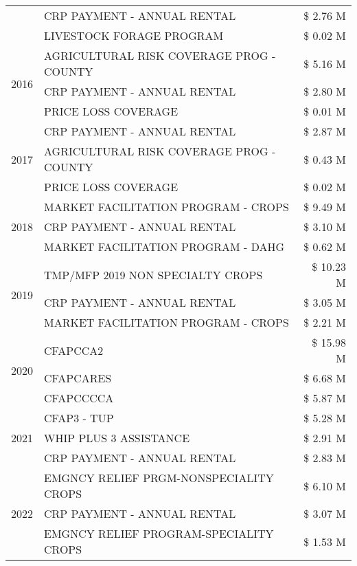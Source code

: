 \begin{tabular}{llr}
 & CRP PAYMENT - ANNUAL RENTAL & \$ 2.76 M \\
 & LIVESTOCK FORAGE PROGRAM & \$ 0.02 M \\
\cline{1-3}
\multirow[t]{3}{*}{2016} & AGRICULTURAL RISK COVERAGE PROG - COUNTY & \$ 5.16 M \\
 & CRP PAYMENT - ANNUAL RENTAL & \$ 2.80 M \\
 & PRICE LOSS COVERAGE & \$ 0.01 M \\
\cline{1-3}
\multirow[t]{3}{*}{2017} & CRP PAYMENT - ANNUAL RENTAL & \$ 2.87 M \\
 & AGRICULTURAL RISK COVERAGE PROG - COUNTY & \$ 0.43 M \\
 & PRICE LOSS COVERAGE & \$ 0.02 M \\
\cline{1-3}
\multirow[t]{3}{*}{2018} & MARKET FACILITATION PROGRAM - CROPS & \$ 9.49 M \\
 & CRP PAYMENT - ANNUAL RENTAL & \$ 3.10 M \\
 & MARKET FACILITATION PROGRAM - DAHG & \$ 0.62 M \\
\cline{1-3}
\multirow[t]{3}{*}{2019} & TMP/MFP 2019 NON SPECIALTY CROPS & \$ 10.23 M \\
 & CRP PAYMENT - ANNUAL RENTAL & \$ 3.05 M \\
 & MARKET FACILITATION PROGRAM - CROPS & \$ 2.21 M \\
\cline{1-3}
\multirow[t]{3}{*}{2020} & CFAPCCA2 & \$ 15.98 M \\
 & CFAPCARES & \$ 6.68 M \\
 & CFAPCCCCA & \$ 5.87 M \\
\cline{1-3}
\multirow[t]{3}{*}{2021} & CFAP3 - TUP & \$ 5.28 M \\
 & WHIP PLUS 3 ASSISTANCE & \$ 2.91 M \\
 & CRP PAYMENT - ANNUAL RENTAL & \$ 2.83 M \\
\cline{1-3}
\multirow[t]{3}{*}{2022} & EMGNCY RELIEF PRGM-NONSPECIALITY CROPS & \$ 6.10 M \\
 & CRP PAYMENT - ANNUAL RENTAL & \$ 3.07 M \\
 & EMGNCY RELIEF PROGRAM-SPECIALITY CROPS & \$ 1.53 M \\
\cline{1-3}
\bottomrule
\end{tabular}
